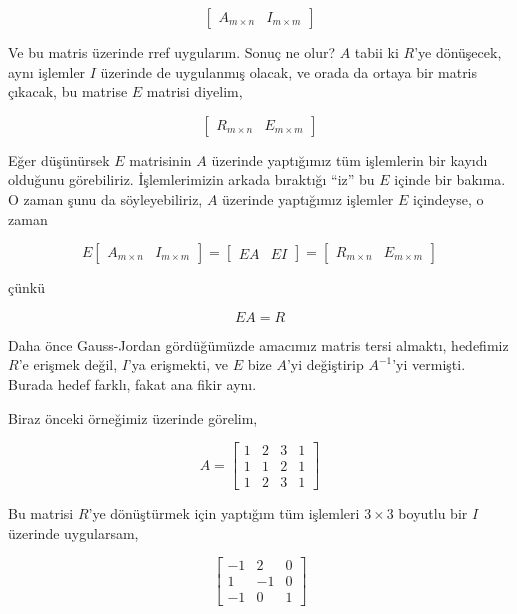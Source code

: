\documentclass[12pt,fleqn]{article}\usepackage{../../common}
\begin{document}
$$ 
\left[\begin{array}{rr}
A_{m \times n} & I_{m \times m}
\end{array}\right]
 $$

Ve bu matris üzerinde rref uygularım. Sonuç ne olur? $A$ tabii ki $R$'ye
dönüşecek, aynı işlemler $I$ üzerinde de uygulanmış olacak, ve orada da
ortaya bir matris çıkacak, bu matrise $E$ matrisi diyelim,

$$ 
\left[\begin{array}{rr}
R_{m \times n} & E_{m \times m}
\end{array}\right]
 $$

Eğer düşünürsek $E$ matrisinin $A$ üzerinde yaptığımız tüm işlemlerin bir
kayıdı olduğunu görebiliriz. İşlemlerimizin arkada bıraktığı ``iz'' bu
$E$ içinde bir bakıma. O zaman şunu da söyleyebiliriz, $A$ üzerinde
yaptığımız işlemler $E$ içindeyse, o zaman 

$$ 
E
\left[\begin{array}{rr}
A_{m \times n} & I_{m \times m}
\end{array}\right] = 
\left[\begin{array}{rr}
EA & EI
\end{array}\right] = 
\left[\begin{array}{rr}
R_{m \times n} & E_{m \times m}
\end{array}\right]
 $$

çünkü 

$$ EA = R $$

Daha önce Gauss-Jordan gördüğümüzde amacımız matris tersi almaktı,
hedefimiz $R$'e erişmek değil, $I$'ya erişmekti, ve $E$ bize $A$'yi
değiştirip $A^{-1}$'yi vermişti. Burada hedef farklı, fakat ana fikir aynı.

Biraz önceki örneğimiz üzerinde görelim, 

$$ 
A = \left[\begin{array}{rrrr}
1 & 2 & 3 & 1 \\
1 & 1 & 2 & 1 \\
1 & 2 & 3 & 1
\end{array}\right]
 $$

Bu matrisi $R$'ye dönüştürmek için yaptığım tüm işlemleri $3 \times 3$
boyutlu bir $I$ üzerinde uygularsam, 

$$ 
\left[\begin{array}{rrr}
-1 & 2 & 0 \\
1 & -1 & 0 \\
-1 & 0 & 1 
\end{array}\right]
 $$
\end{document}
